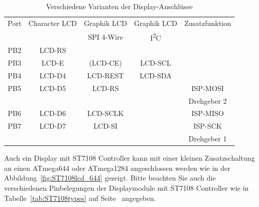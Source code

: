 \begin{table}[H]
  \begin{center}
    \begin{tabular}{| c || c | c | c | c |}
    \hline
      Port & Character LCD &  Graphik LCD & Graphik LCD  & Zusatzfunktion      \\
           &               &  SPI 4-Wire  &  I\textsuperscript{2}C         &                     \\
    \hline
    \hline
    PB2    &  LCD-RS         &            &             &       \\
    \hline
    PB3    &  LCD-E          & (LCD-CE)   &  LCD-SCL    &       \\
    \hline
    PB4    &  LCD-D4         & LCD-REST   &  LCD-SDA    &       \\
    \hline
    PB5    &  LCD-D5         & LCD-RS     &             & ISP-MOSI \\
           &                 &            &             & Drehgeber 2 \\
    \hline
    PB6    &  LCD-D6         & LCD-SCLK   &             & ISP-MISO \\
    \hline
    PB7    &  LCD-D7         & LCD-SI     &             & ISP-SCK  \\
           &                 &            &             & Drehgeber 1 \\
    \hline
    \end{tabular}
  \end{center}
  \caption{Verschiedene Varianten der Display-Anschlüsse}
  \label{tab:mega644-display}
\end{table}

Auch ein Display mit ST7108 Controller kann mit einer kleinen Zusatzschaltung an einen
ATmega644 oder ATmega1284 angeschlossen werden wie in der Abbildung~\ref{fig:ST7108lcd_644} gezeigt.
Bitte beachten Sie auch die verschiedenen Pinbelegungen der Displaymodule mit ST7108 Controller wie in
Tabelle~\ref{tab:ST7108types} auf Seite~\pageref{tab:ST7108types} angegeben.

